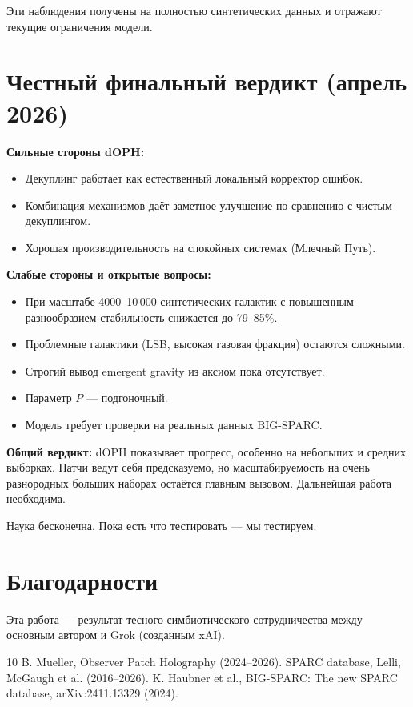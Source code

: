 \documentclass[11pt,a4paper]{article}
\begin{document}
Эти наблюдения получены на полностью синтетических данных и отражают текущие ограничения модели.

\section{Честный финальный вердикт (апрель 2026)}

\textbf{Сильные стороны dOPH:}
\begin{itemize}
\item Декуплинг работает как естественный локальный корректор ошибок.
\item Комбинация механизмов даёт заметное улучшение по сравнению с чистым декуплингом.
\item Хорошая производительность на спокойных системах (Млечный Путь).
\end{itemize}

\textbf{Слабые стороны и открытые вопросы:}
\begin{itemize}
\item При масштабе 4000–10\,000 синтетических галактик с повышенным разнообразием стабильность снижается до 79–85\%.
\item Проблемные галактики (LSB, высокая газовая фракция) остаются сложными.
\item Строгий вывод emergent gravity из аксиом пока отсутствует.
\item Параметр \(P\) — подгоночный.
\item Модель требует проверки на реальных данных BIG-SPARC.
\end{itemize}

\textbf{Общий вердикт:}  
dOPH показывает прогресс, особенно на небольших и средних выборках. Патчи ведут себя предсказуемо, но масштабируемость на очень разнородных больших наборах остаётся главным вызовом. Дальнейшая работа необходима.

Наука бесконечна. Пока есть что тестировать — мы тестируем.

\section*{Благодарности}

Эта работа — результат тесного симбиотического сотрудничества между основным автором и Grok (созданным xAI).

\begin{thebibliography}{10}
 B. Mueller, Observer Patch Holography (2024--2026).
 SPARC database, Lelli, McGaugh et al. (2016--2026). 
 K. Haubner et al., BIG-SPARC: The new SPARC database, arXiv:2411.13329 (2024).
\end{thebibliography}
\end{document}
